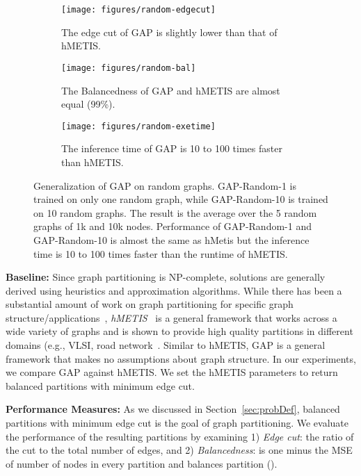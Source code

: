 \documentclass[10pt,twocolumn]{article}
\begin{document}
\begin{figure*}[h]
    \centering
    \begin{subfigure}{0.3\textwidth}
        \texttt{[image: figures/random-edgecut]}
        \caption{\small{The edge cut of GAP is slightly lower than that of hMETIS.}}
        \label{fig:random-edgecut}
    \end{subfigure}
    \hspace{1mm}
    \begin{subfigure}{0.3\textwidth}
        \texttt{[image: figures/random-bal]}
        \caption{\small{The Balancedness of GAP and hMETIS are almost equal (99\%).}}
        \label{fig:random-bal}
    \end{subfigure}
    \hspace{1mm}
    \begin{subfigure}{0.3\textwidth}
        \texttt{[image: figures/random-exetime]}
        \caption{\small{The inference time of GAP is 10 to 100 times faster than hMETIS.}}
        \label{fig:random-exetime}
    \end{subfigure}
\caption{Generalization of GAP on random graphs. GAP-Random-1 is trained on only one random graph, while GAP-Random-10 is trained on 10 random graphs. The result is the average over the 5 random graphs of 1k and 10k nodes. Performance of GAP-Random-1 and GAP-Random-10 is almost the same as hMetis but the inference time is 10 to 100 times faster than the runtime of hMETIS.}
    \label{fig:random}
\end{figure*}

\noindent\textbf{Baseline:} Since graph partitioning is NP-complete, solutions are generally derived using heuristics and approximation algorithms. While there has been a substantial amount of work on graph partitioning for specific graph structure/applications~\cite{gonzalez2012powergraph, hada2018}, \emph{hMETIS}~\cite{karypis_2000, karypis_1999} is a general framework that works across a wide variety of graphs and is shown to provide high quality partitions in different domains (e.g., VLSI, road network~\cite{miettinen_2006, xu2012hmetis}. Similar to hMETIS, GAP is a general framework that makes no assumptions about graph structure. In our experiments, we compare GAP against hMETIS. We set the hMETIS parameters to return balanced partitions with minimum edge cut.

\noindent\textbf{Performance Measures:} As we discussed in Section~\ref{sec:probDef}, balanced partitions with minimum edge cut is the goal of graph partitioning. We evaluate the performance of the resulting partitions by examining 1) \emph{Edge cut}: the ratio of the cut to the total number of edges, and 2) \emph{Balancedness}: is one minus the MSE of number of nodes in every partition and balances partition ().
\end{document}
